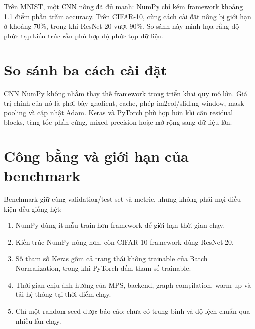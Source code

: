 \documentclass[12pt,a4paper]{report}
\begin{document}
Trên MNIST, một CNN nông đã đủ mạnh: NumPy chỉ kém framework khoảng 1.1 điểm phần trăm accuracy.
Trên CIFAR-10, cùng cách cài đặt nông bị giới hạn ở khoảng 70\%, trong khi ResNet-20 vượt 90\%.
So sánh này minh họa rằng độ phức tạp kiến trúc cần phù hợp độ phức tạp dữ liệu.

\section{So sánh ba cách cài đặt}
\begin{table}[H]
\centering
\caption{Ưu và nhược điểm của ba cách cài đặt CNN}
\label{tab:implementation_tradeoff}
\end{table}

CNN NumPy không nhằm thay thế framework trong triển khai quy mô lớn.
Giá trị chính của nó là phơi bày gradient, cache, phép im2col/sliding window, mask pooling và cập nhật Adam.
Keras và PyTorch phù hợp hơn khi cần residual blocks, tăng tốc phần cứng, mixed precision hoặc mở rộng sang dữ liệu lớn.

\section{Công bằng và giới hạn của benchmark}
Benchmark giữ cùng validation/test set và metric, nhưng không phải mọi điều kiện đều giống hệt:
\begin{enumerate}
    \item NumPy dùng ít mẫu train hơn framework để giới hạn thời gian chạy.
    \item Kiến trúc NumPy nông hơn, còn CIFAR-10 framework dùng ResNet-20.
    \item Số tham số Keras gồm cả trạng thái không trainable của Batch Normalization, trong khi PyTorch đếm tham số trainable.
    \item Thời gian chịu ảnh hưởng của MPS, backend, graph compilation, warm-up và tải hệ thống tại thời điểm chạy.
    \item Chỉ một random seed được báo cáo; chưa có trung bình và độ lệch chuẩn qua nhiều lần chạy.
\end{enumerate}
\end{document}
